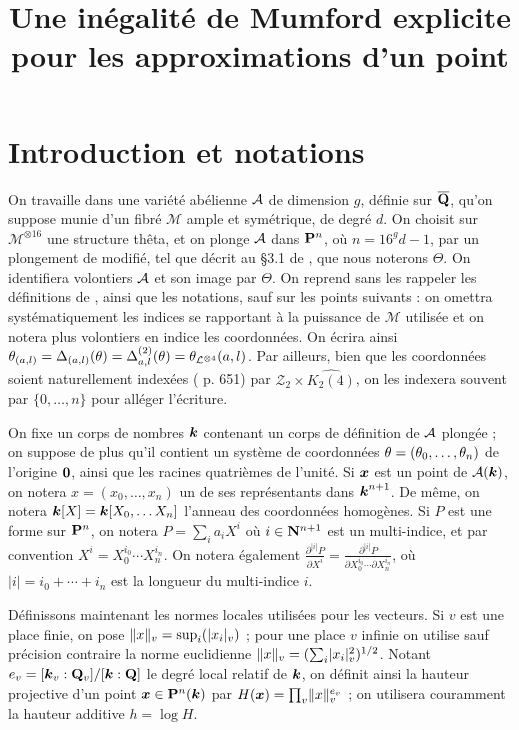\documentclass{mpg-preth}
\title{Une inégalité de Mumford explicite\\
  pour les approximations d'un point}
\begin{document}
\maketitle

\section*{Introduction et notations}

On travaille dans une variété abélienne $\mathcal{A}$ de dimension $g$, définie sur
$\overline{{\mathbf{Q}}}$, qu'on suppose munie d'un fibré $\mathcal{M}$ ample et symétrique, de
degré $d$. On choisit sur $\mathcal{M}^{\otimes 16}$ une structure thêta, et
on plonge $\mathcal{A}$ dans ${\mathbf{P}}^n$, où $n=16^g d - 1$, par un plongement de
 modifié, tel que décrit au §3.1 de \cite{daphimhva2}, que nous
noterons $\Theta$. On identifiera volontiers $\mathcal{A}$ et son image par $\Theta$.
On reprend sans les rappeler les définitions de , ainsi que les
notations, sauf sur les points suivants : on omettra systématiquement les
indices se rapportant à la puissance de $\mathcal{M}$ utilisée et on notera
plus volontiers en indice les coordonnées. On écrira ainsi $\theta_{(a, l)} =
\Delta_{(a, l)}(\theta)  = \Delta_{a, l}^{(2)}(\theta) =
\theta_{\mathcal{L}^{\otimes 4}}(a, l)$. Par ailleurs, bien que les coordonnées
soient naturellement indexées ( p. 651) par $\mathcal{Z}_2 \times
\widehat{K_2(4)}$, on les indexera souvent par $\{0, \dots, n\}$ pour alléger
l'écriture.

On fixe un corps de nombres $\boldsymbol{k}$ contenant un corps de définition de $\mathcal{A}$
plongée ; on suppose de plus qu'il contient un système de coordonnées $\theta =
(\theta_0,\dots,\theta_n)$ de l'origine ${\boldsymbol{0}}$, ainsi que les racines quatrièmes de
l'unité. Si ${\boldsymbol{x}}$ est un point de $\mathcal{A}(\boldsymbol{k})$, on notera $x = (x_0, \dots,
x_n)$ un de ses représentants dans $\boldsymbol{k}^{n+1}$. De même, on notera $\boldsymbol{k}[X] =
\boldsymbol{k}[X_0, \dots X_n]$ l'anneau des coordonnées homogènes. Si $P$ est une forme
sur ${\mathbf{P}}^n$, on notera $P= \sum_i a_i X^i$ où $i \in {\mathbf{N}}^{n+1}$ est un
multi-indice, et par convention $X^i = X_0^{i_0}\cdots X_n^{i_n}$. On notera
également $\frac{\partial^{|i|} P}{\partial X^i} = \frac{\partial^{|i|}
  P}{\partial X_0^{i_0}\cdots \partial X_n^{i_n}}$, où $|i| = i_0 + \cdots +
i_n$ est la longueur du multi-indice $i$.

Définissons maintenant les normes locales utilisées pour les vecteurs. Si $v$
est une place finie, on pose $\lVert x\rVert_{v} = \sup_i(\lvert x_i\rvert_{v})$ ; pour une place $v$
infinie on utilise sauf précision contraire la norme euclidienne $\lVert x\rVert_{v} = (
\sum_i \lvert x_i\rvert_{v}^2 )^{1/2}$. Notant $e_v = [\boldsymbol{k}_v : {\mathbf{Q}}_v]/[\boldsymbol{k} : {\mathbf{Q}}]$ le degré
local relatif de $\boldsymbol{k}$, on définit ainsi la hauteur projective d'un point
${\boldsymbol{x}} \in {\mathbf{P}}^n(\boldsymbol{k})$ par $H({\boldsymbol{x}}) = \prod_v \lVert x\rVert_{v}^{e_v}$ ; on utilisera
couramment la hauteur additive $h = \log H$.
\end{document}
